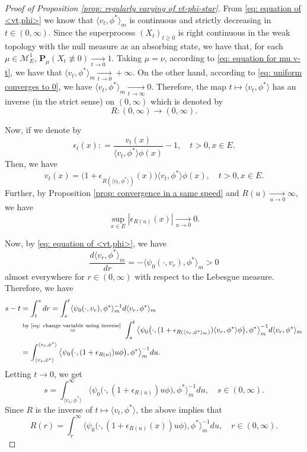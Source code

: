 \documentclass[12pt, a4paper]{amsart}
\theoremstyle{definition}
\numberwithin{equation}{section}
\begin{document}
\begin{proof}[Proof of Proposition \ref{prop: regularly varying of vt-phi-star}]
	
	From \eqref{eq: equation of <vt,phi>} we know that $\langle v_t,\phi^* \rangle_m$ is continuous and strictly decreasing in $t \in (0,\infty)$.
	Since the superprocess $(X_t)_{t\geq 0}$
	is right continuous in the weak topology with the null measure as an absorbing state, we have that, for each $\mu \in \mathcal M_E^1$, $\mathbf P_\mu (X_t \not \equiv 0) \xrightarrow[t\to 0]{} 1$.
	Taking $\mu = \nu$, according to \eqref{eq: equation for mu v-t}, we have that $\langle v_{t}, \phi^*\rangle_m \xrightarrow[t\to 0]{} +\infty$.
	On the other hand,
	according to \eqref{eq: uniform converges to 0},
	we have $\langle v_{t}, \phi^*\rangle_m \xrightarrow[t\to \infty]{} 0$.
	Therefore, the map $t\mapsto \langle v_t,\phi^*  \rangle$ has an inverse (in the strict sense) on $(0,\infty)$
which is denoted by
\[
	R: (0,\infty) \to (0,\infty).
\]
	
	Now, if we denote by
\[
	\epsilon_{t}(x)
	: = \frac{v_t(x)}{\langle v_t, \phi^*\rangle \phi(x)} - 1,
	\quad t>0, x\in E.
\]
	Then, we have
\[\label{eq: change variable using inverse}
	v_t(x)
	= \big(1+ \epsilon_{R(\langle v_t,\phi^* \rangle)}(x) \big )\langle v_t,\phi^* \rangle \phi(x),
	\quad t>0, x\in E.
\]
	Further, by Proposition \ref{prop: convergence in a same speed} and $R(u)\xrightarrow[u\to 0]{} \infty$, we have
\[\label{eq: epsilon R converges to 0}
	\sup_{x\in E}|\epsilon_{R(u)}(x)|
	\xrightarrow[u\to 0]{} 0.
\]

	Now, by \eqref{eq: equation of <vt,phi>}, we have
\[
	\frac{d \langle v_r, \phi^* \rangle_m}{dr}
	= - \langle \psi_0(\cdot ,v_r) ,\phi^*\rangle_m
	> 0
\]
	almost everywhere for $r\in (0,\infty)$ with respect to the Lebesgue measure.
	Therefore, we have
\[\begin{split}
	s-t
	& = \int_t^s dr
	= \int_s^t \langle \psi_0(\cdot ,v_r), \phi^*\rangle _m^{-1} d\langle v_r ,\phi^* \rangle_m
	\\&\overset{\text{by \eqref{eq: change variable using inverse} }}{=} \int_s^t \big\langle \psi_0\big( \cdot ,(1+ \epsilon_{R(\langle v_r,\phi^* \rangle_m)})\langle v_r,\phi^*\rangle \phi \big), \phi^* \big\rangle _m^{-1} d\langle v_r ,\phi^* \rangle_m
	\\&= \int_{\langle v_s,\phi^*\rangle}^{\langle v_t, \phi^* \rangle} \big\langle \psi_0 \big( \cdot ,( 1 + \epsilon_{R(u)} ) u \phi \big), \phi^* \big\rangle_m^{-1} du.
\end{split}\]
	Letting $t\to 0$, we get
\[
	s
	= \int_{\langle v_s,\phi^*\rangle}^\infty \big\langle \psi_0 \big(\cdot ,( 1 + \epsilon_{R(u)} ) u \phi \big), \phi^* \big\rangle_m^{-1} du,
	\quad s\in (0,\infty).
\]
	Since $R$ is the inverse of $t\mapsto \langle v_t,\phi^*\rangle$, the above implies that
\[\label{eq: integral equation for R}
	R(r)
	= \int_r^\infty \big\langle \psi_0 \big(\cdot ,( 1 + \epsilon_{R(u)}(x) ) u \phi \big), \phi^* \big\rangle_m^{-1} du,
	\quad r\in (0,\infty).
\]
	

\end{proof}
\end{document}

